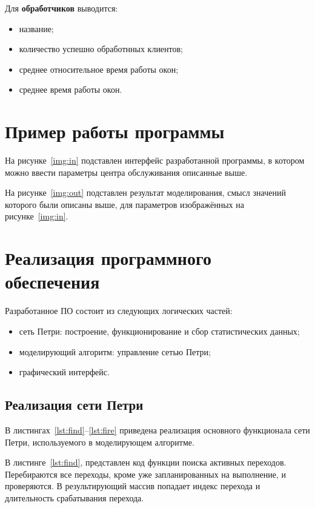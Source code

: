 Для \textbf{обработчиков} выводится:
\begin{itemize}[label=---]
	\item название;
	\item количество успешно обработнных клиентов;
	\item среднее относительное время работы окон;
	\item среднее время работы окон.
\end{itemize}

\section{Пример работы программы}

На рисунке~\ref{img:in} подставлен интерфейс разработанной программы, в котором можно ввести параметры центра обслуживания описанные выше.

\FloatBarrier

На рисунке~\ref{img:out} подставлен результат моделирования, смысл значений которого были описаны выше, для параметров изображённых на рисунке~\ref{img:in}.

\FloatBarrier

\section{Реализация программного обеспечения}

Разработанное ПО состоит из следующих логических частей:
\begin{itemize}[label=---]
	\item сеть Петри: построение, функционирование и сбор статистических данных;
	\item моделирующий алгоритм: управление сетью Петри;
	\item графический интерфейс.
\end{itemize}

\subsection{Реализация сети Петри}

В листингах~\ref{lst:find}--\ref{lst:fire} приведена реализация основного функционала сети Петри, используемого в моделирующем алгоритме.

В листинге~\ref{lst:find}, представлен код функции поиска активных переходов. Перебираются все переходы, кроме уже запланированных на выполнение, и проверяются. В результирующий массив попадает индекс перехода и длительность срабатывания перехода. 

